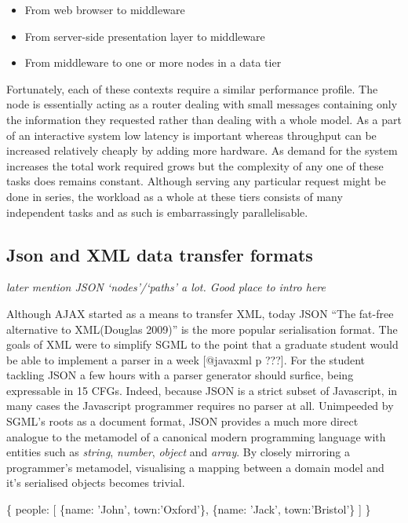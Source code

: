 \documentclass[]{article}
\newenvironment{Shaded}{}{}
\newcommand{\DataTypeTok}[1]{\textcolor[rgb]{0.56,0.13,0.00}{{#1}}}
\newcommand{\StringTok}[1]{\textcolor[rgb]{0.25,0.44,0.63}{{#1}}}
\newcommand{\NormalTok}[1]{{#1}}
\begin{document}
\begin{itemize}
\itemsep1pt\parskip0pt
\item
  From web browser to middleware
\item
  From server-side presentation layer to middleware
\item
  From middleware to one or more nodes in a data tier
\end{itemize}

Fortunately, each of these contexts require a similar performance
profile. The node is essentially acting as a router dealing with small
messages containing only the information they requested rather than
dealing with a whole model. As a part of an interactive system low
latency is important whereas throughput can be increased relatively
cheaply by adding more hardware. As demand for the system increases the
total work required grows but the complexity of any one of these tasks
does remains constant. Although serving any particular request might be
done in series, the workload as a whole at these tiers consists of many
independent tasks and as such is embarrassingly parallelisable.

\subsection{Json and XML data transfer formats}

\emph{later mention JSON `nodes'/`paths' a lot. Good place to intro
here}

Although AJAX started as a means to transfer XML, today JSON ``The
fat-free alternative to XML(Douglas 2009)'' is the more popular
serialisation format. The goals of XML were to simplify SGML to the
point that a graduate student would be able to implement a parser in a
week {[}@javaxml p ???{]}. For the student tackling JSON a few hours
with a parser generator should surfice, being expressable in 15 CFGs.
Indeed, because JSON is a strict subset of Javascript, in many cases the
Javascript programmer requires no parser at all. Unimpeeded by SGML's
roots as a document format, JSON provides a much more direct analogue to
the metamodel of a canonical modern programming language with entities
such as \emph{string}, \emph{number}, \emph{object} and \emph{array}. By
closely mirroring a programmer's metamodel, visualising a mapping
between a domain model and it's serialised objects becomes trivial.

\begin{Shaded}
\begin{Highlighting}[]
\NormalTok{\{}
   \DataTypeTok{people}\NormalTok{: [}
      \NormalTok{\{}\DataTypeTok{name}\NormalTok{: }\StringTok{'John'}\NormalTok{, }\DataTypeTok{town}\NormalTok{:}\StringTok{'Oxford'}\NormalTok{\},}
      \NormalTok{\{}\DataTypeTok{name}\NormalTok{: }\StringTok{'Jack'}\NormalTok{, }\DataTypeTok{town}\NormalTok{:}\StringTok{'Bristol'}\NormalTok{\}}
   \NormalTok{]}
\NormalTok{\}}
\end{Highlighting}
\end{Shaded}
\end{document}
